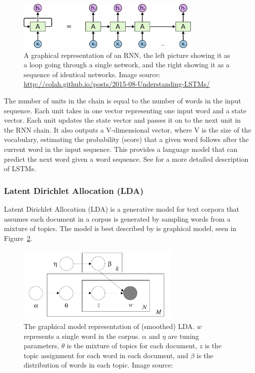 \documentclass[12pt,a4paper,utf8]{article}
\begin{document}
\begin{figure}[hb]
    \centering
    \includegraphics[width=0.80\textwidth]{RNN-unrolled}
    \caption{A graphical representation of an RNN, the left picture showing it as a loop going through a single network, and the right showing it as a sequence of identical networks. Image source: \url{http://colah.github.io/posts/2015-08-Understanding-LSTMs/}}    
    \label{fig:rnn}
\end{figure}

The number of units in the chain is equal to the number of words in the input sequence. Each unit takes in one vector representing one input word and a state vector. Each unit updates the state vector and passes it on to the next unit in the RNN chain. It also outputs a V-dimensional vector, where V is the size of the vocabulary, estimating the probability (score) that a given word follows after the current word in the input sequence. This provides a language model that can predict the next word given a word sequence. See \cite{LSTM} for a more detailed description of LSTMs.

\subsubsection{Latent Dirichlet Allocation (LDA)}

Latent Dirichlet Allocation (LDA)\cite{blei2003latent} is a generative model for text corpora that assumes each document in a corpus is generated by sampling words from a mixture of topics. The model is best described by is graphical model, seen in Figure~\ref{fig:lda}. 

\begin{figure}[htbp]
    \centering
    \includegraphics[width=0.70\textwidth]{lda}
    \caption{The graphical model representation of (smoothed) LDA. $w$ represents a single word in the corpus. $\alpha$ and $\eta$ are tuning parameters, $\theta$ is the mixture of topics for each document, $z$ is the topic assignment for each word in each document, and $\beta$ is the distribution of words in each topic. Image source: \cite{blei2003latent}}    
    \label{fig:lda}
\end{figure}
\end{document}
